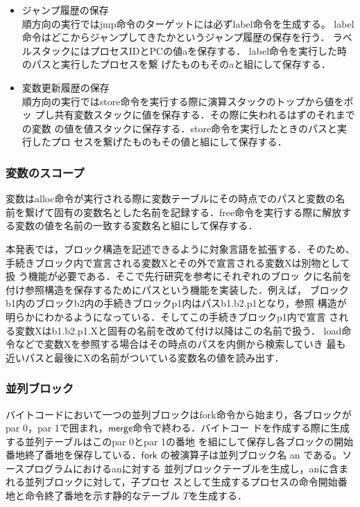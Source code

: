 \documentclass[submit,PRO]{ipsj}
\newcommand{\bcode}[1]{$\mathsf{#1}$}
\begin{document}
\begin{itemize}
 \item ジャンプ履歴の保存\\
順方向の実行ではjmp命令のターゲットには必ずlabel命令を生成する。
label命令はどこからジャンプしてきたかというジャンプ履歴の保存を行う．
ラベルスタックにはプロセスIDとPCの値aを保存する．
label命令を実行した時のパスと実行したプロセスを繋
げたものもそのaと組にして保存する．
\item 変数更新履歴の保存\\
順方向の実行ではstore命令を実行する際に演算スタックのトップから値をポッ
プし共有変数スタックに値を保存する．その際に失われるはずのそれまでの変数
の値を値スタックに保存する．store命令を実行したときのパスと実行したプロ
セスを繋げたものもその値と組にして保存する．
\end{itemize}

\subsubsection{変数のスコープ}

変数はalloc命令が実行される際に変数テーブルにその時点でのパスと変数の名
前を繋げて固有の変数名とした名前を記録する．free命令を実行する際に解放す
る変数の値を名前の一致する変数名と組にして保存する．

本発表では，ブロック構造を記述できるように対象言語を拡張する．そのため、
手続きブロック内で宣言される変数Xとその外で宣言される変数Xは別物として扱
う機能が必要である．そこで先行研究\cite{HIY18,H20}を参考にそれぞれのブロッ
クに名前を付け参照構造を保存するためにパスという機能を実装した．例えば，
ブロックb1内のブロックb2内の手続きブロックp1内はパスb1.b2.p1となり，参照
構造が明らかにわかるようになっている．そしてこの手続きブロックp1内で宣言
される変数Xはb1.b2.p1.Xと固有の名前を改めて付け以降はこの名前で扱う．
load命令などで変数Xを参照する場合はその時点のパスを内側から検索していき
最も近いパスと最後にXの名前がついている変数名の値を読み出す．

\subsubsection{並列ブロック}

バイトコードにおいて一つの並列ブロックはfork命令から始まり，各ブロックが
{\sf par 0}，{\sf par 1}で囲まれ，\bcode{merge}命令で終わる．バイトコー
ドを作成する際に生成する並列テーブルはこの{\sf par 0}と{\sf par 1}の番地
を組にして保存し各ブロックの開始番地終了番地を保存している．\bcode{fork}
の被演算子は並列ブロック名 an である。ソースプログラムにおけるanに対する
並列ブロックテーブルを生成し，anに含まれる並列ブロックに対して，子プロセ
スとして生成するプロセスの命令開始番地と命令終了番地を示す静的なテーブル
$T$を生成する．
\end{document}
